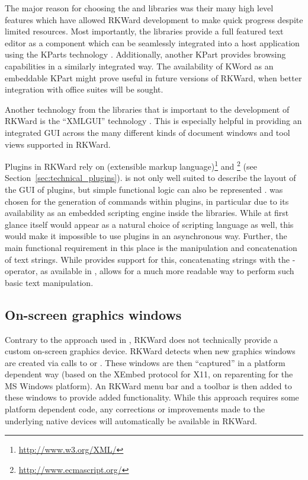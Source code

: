 The major reason for choosing the  and  libraries was their 
many high level features which have allowed RKWard development to make quick
progress despite limited resources. Most importantly, the  libraries provide a
full featured text editor \citep{CullmannND} as a component which can be
seamlessly integrated into a host application using the KParts technology
\citep{Faure2000}. Additionally, another KPart provides  browsing capabilities in a
similarly integrated way. The availability of KWord \citep{KWord} as an
embeddable KPart might prove useful in future versions of RKWard, when better
integration with office suites will be sought.

Another technology from the  libraries that is important to the development
of RKWard is the ``XMLGUI'' technology
\citep{Faure2000}. This is especially helpful in providing an integrated GUI across
the many different kinds of document windows and tool views supported in RKWard.

Plugins in RKWard rely on  (extensible markup language)\footnote{\url{http://www.w3.org/XML/}}
and \footnote{\url{http://www.ecmascript.org/}} (see Section~\ref{sec:technical_plugins}).  is not
only well suited to describe the layout of the GUI of plugins, but simple
functional logic can also be represented \citep[see also][]{Visne2009}.  was
chosen for the generation of  commands within plugins, in particular due to its
availability as an embedded scripting engine inside the  libraries. While at
first glance  itself would appear as a natural choice of scripting language as
well, this would make it impossible to use plugins in an asynchronous way.
Further, the main functional requirement in this place is the manipulation and
concatenation of text strings. While  provides support for this, concatenating
strings with the \code{+}-operator, as available in , allows for a much
more readable way to perform such basic text manipulation.

\subsection{On-screen graphics windows}
\label{sec:technical_graphics}
Contrary to the approach used in  \citep{HelbigTheus2005}, RKWard does
not technically provide a custom on-screen graphics device. RKWard detects when
new graphics windows are created via calls to  or . These windows
are then ``captured'' in a platform dependent way (based on the XEmbed \citep{Ettrich2002} protocol
for X11, on reparenting for the MS Windows platform). An RKWard menu bar and a
toolbar is then added to these windows to provide added functionality. While
this approach requires some platform dependent code, any corrections or
improvements made to the underlying  native devices will automatically be
available in RKWard.

